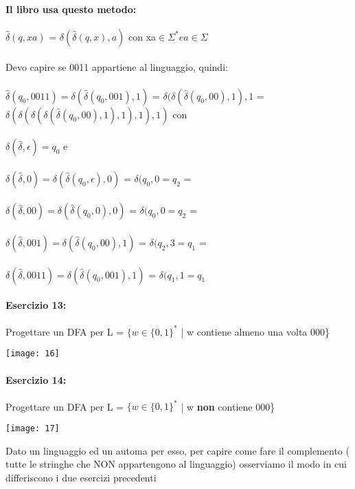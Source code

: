 \documentclass[12pt, a4paper, openany, oneside]{book}
\begin{document}
\paragraph{Il libro usa questo metodo: }
$\widehat{\delta}(q,xa)$ = $\delta(\widehat{\delta}(q,x),a)$ 
con xa$\in \Sigma^{*} e a \in \Sigma$
\\ \\ 
Devo capire se 0011 appartiene al linguaggio, quindi: \\ \\
$\widehat{\delta}(q_{0},0011) = \delta(\widehat{\delta}(q_{0},001),1)$ =
$\delta(\delta(\widehat{\delta}(q_{0},00),1),1$ =  
$\delta(\delta(\delta(\delta(\widehat{\delta}(q_{0},00),1),1),1),1)$ con \\ \\
$\delta(\widehat{\delta}, \epsilon) = q_{0}$ e \\ \\
$\delta(\widehat{\delta},0) = \delta(\widehat{\delta}(q_{0},\epsilon),0)$ =
$\delta(q_{0},0 = q_{2}$ =\\ \\
$\delta(\widehat{\delta},00) = \delta(\widehat{\delta}(q_{0},0),0)$ =
$\delta(q_{0},0 = q_{2}$ = \\ \\
$\delta(\widehat{\delta},001) = \delta(\widehat{\delta}(q_{0},00),1)$ =
$\delta(q_{2},3 = q_{1}$ = \\ \\
$\delta(\widehat{\delta},0011) = \delta(\widehat{\delta}(q_{0},001),1)$ =
$\delta(q_{1},1 = q_{1}$
\paragraph{Esercizio 13: }
Progettare un DFA per L = $\{w \in \{0,1\}^{*}$ | w contiene almeno una volta
000\}
\begin{center}
\texttt{[image: 16]}
\end{center}
\paragraph{Esercizio 14: }
Progettare un DFA per L = $\{w \in \{0,1\}^{*}$ | w \textbf{non} contiene
000\}
\begin{center}
\texttt{[image: 17]}
\end{center}
Dato un linguaggio ed un automa per esso, per capire come fare il complemento (
tutte le stringhe che NON appartengono al linguaggio) osserviamo il modo in cui
differiscono i due esercizi precedenti 
\end{document}
